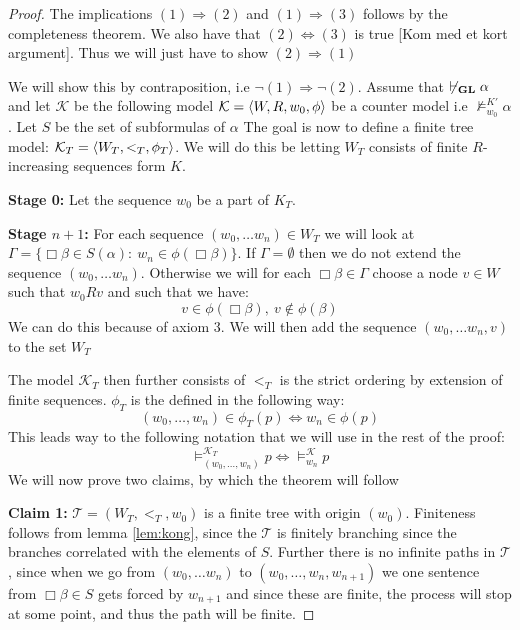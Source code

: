 \documentclass[../main.tex]{subfiles}
\begin{document}
\begin{proof}
	The implications $(1)\Rightarrow (2)$ and $(1)\Rightarrow(3)$ follows
	by the completeness theorem. We also have that $(2)\Leftrightarrow (3)$
	is true [Kom med et kort argument]. Thus we will just have to show $(2)\Rightarrow(1)$

	We will show this by contraposition, i.e $\neg(1)\Rightarrow\neg(2)$.
	Assume that $\not\vdash_{\text{\textbf{GL}}}\alpha$ and
let $\mathcal{K}$ be the following model $\mathcal{K}=\langle W,R,w_0,\phi\rangle $ be a counter model i.e
	$\not\vDash_{w_0}^{K'}\alpha$. Let $S$ be the set of subformulas of
	$\alpha$ The goal is now to define a finite tree
	model: $\mathcal{K}_T=\langle W_T,<_T,\phi_T\rangle$. We will do this be
	letting $W_T$ consists of finite $R$-increasing sequences form $K$.

	\textbf{Stage 0:} Let the sequence $w_0$ be a part of $K_T$.

	\textbf{Stage $n+1$:} For each sequence $(w_0,\ldots w_n)\in W_T$ we
	will look at $\Gamma=\{\Box\beta\in S(\alpha):\
	w_n\in\phi(\Box\beta)\}$.
	If $\Gamma=\emptyset$ then we do not extend the sequence $(w_0,\ldots
	w_n)$. Otherwise we will for each $\Box\beta\in\Gamma$ choose a node
	$v\in W$ such that $w_0Rv$ and such that we have:
	$$v\in\phi(\Box\beta),\ v\not\in\phi(\beta)$$
	We can do this because of axiom 3. We will then add the sequence
	$(w_0,\ldots w_n,v)$ to the set $W_T$

	The model $\mathcal{K}_T$ then further consists of $<_T$ is the strict
	ordering by extension of finite sequences. $\phi_T$ is the defined in
	the following way:
	$$(w_0,\ldots,w_n)\in \phi_T(p)\Leftrightarrow w_n\in\phi(p)$$
	This leads way to the following notation that we will use in the rest
	of the proof:
	$$\vDash_{(w_0,\ldots,w_n)}^{\mathcal{K}_T}p\Leftrightarrow\vDash_{w_n}^\mathcal{K} p$$
	We will now prove two claims, by which the theorem will follow 

	\textbf{Claim 1:} $\mathcal{T}=(W_T,<_T,w_0)$ is a finite tree with origin $(w_0)$.
	Finiteness follows from lemma \ref{lem:kong}, since the $\mathcal{T}$
	is finitely branching since the branches correlated with the elements
	of $S$. Further there is no infinite paths in $\mathcal{T}$, since when
	we go from $(w_0,\ldots w_n)$ to $(w_0,\ldots, w_n,w_{n+1})$ we one
	sentence from $\Box\beta\in S$ gets forced by $w_{n+1 }$ and since
	these are finite, the process will stop at some point, and thus the
	path will be finite.


\end{proof}
\end{document}
